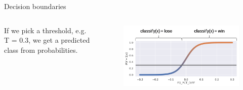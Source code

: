 \documentclass[aspectratio=169]{../latex_main/tntbeamer}  %
\begin{document}
	\begin{frame}{Decision boundaries}
	    \begin{columns}
	        \begin{column}{.5\textwidth}
	            If we pick a threshold, e.g. T = 0.3, we get a predicted class from probabilities.
	        \end{column}
	        
	        
	        \begin{column}{.5\textwidth}
	                \begin{figure}
	                    \centering
	                    \includegraphics[scale=.55]{Bild34}\\
	                \end{figure}
	        \end{column}
	        
	    \end{columns}
	\end{frame}
	
\end{document}
